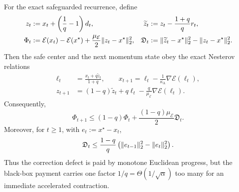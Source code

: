 \begin{lemma}
\label{lem:aesp-cd-estimate-defect}
For the exact safeguarded recurrence, define
\begin{align}
 z_t&:=x_t+\left(\frac1q-1\right)d_t,
 &\widetilde z_t
 &:=z_t-\frac{1+q}{q}r_t,
 \label{eq:aesp-cd-momentum-states}\\
 \Phi_t&:=\mathcal E(x_t)-\mathcal E(x^\star)
       +\frac{\mu_{\mathcal E}}2
        \lVert z_t-x^\star\rVert_2^2,
 &\mathfrak D_t
 &:=\lVert\widetilde z_t-x^\star\rVert_2^2
   -\lVert z_t-x^\star\rVert_2^2.
 \label{eq:aesp-cd-potential-defect}
\end{align}
Then the safe center and the next momentum state obey the exact Nesterov
relations
\begin{align}
 \ell_t&=\frac{x_t+q\widetilde z_t}{1+q},
 \qquad
 x_{t+1}=\ell_t-\frac1{\kappa_{\mathrm A}}
                    \nabla\mathcal E(\ell_t),
 \label{eq:aesp-cd-corrected-nesterov}\\
 z_{t+1}
 &=(1-q)\widetilde z_t+q\ell_t
   -\frac q{\mu_{\mathcal E}}\nabla\mathcal E(\ell_t).
 \label{eq:aesp-cd-corrected-estimate-state}
\end{align}
Consequently,
\begin{equation}
 \Phi_{t+1}
 \leq(1-q)\Phi_t
   +\frac{(1-q)\mu_{\mathcal E}}2\mathfrak D_t.
 \label{eq:aesp-cd-defective-contraction}
\end{equation}
Moreover, for $t\geq1$, with $e_t:=x^\star-x_t$,
\begin{equation}
 \mathfrak D_t
 \leq\frac{1-q}{q}
 \left(\lVert e_{t-1}\rVert_2^2-\lVert e_t\rVert_2^2\right).
 \label{eq:aesp-cd-defect-telescope}
\end{equation}
Thus the correction defect is paid by monotone Euclidean progress, but the
black-box payment carries one factor $1/q=\Theta(1/\sqrt\alpha)$ too many for
an immediate accelerated contraction.
\end{lemma}


